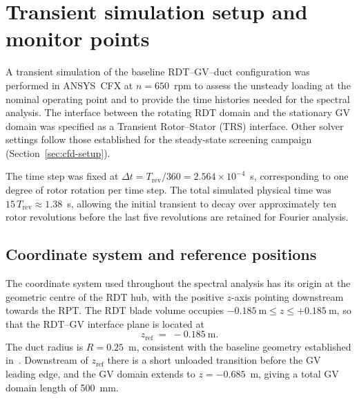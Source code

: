 
\section{Transient simulation setup and monitor points}
\label{sec:monitor-setup}

A transient simulation of the baseline \ac{RDT}--\ac{GV}--duct
configuration was performed in ANSYS~CFX at $n = 650$~rpm to assess
the unsteady loading at the nominal operating point and to provide
the time histories needed for the spectral analysis. The interface
between the rotating \ac{RDT} domain and the stationary \ac{GV}
domain was specified as a Transient Rotor--Stator (TRS) interface.
Other solver settings follow those established for the steady-state
screening campaign (Section~\ref{sec:cfd-setup}).

The time step was fixed at $\Delta t = T_{\mathrm{rev}}/360
= 2.564\times 10^{-4}$~s, corresponding to one degree of rotor
rotation per time step. The total simulated physical time was
$15\,T_{\mathrm{rev}} \approx 1.38$~s, allowing the initial
transient to decay over approximately ten rotor revolutions before
the last five revolutions are retained for Fourier analysis.

\subsection{Coordinate system and reference positions}
\label{sec:coord-system}

The coordinate system used throughout the spectral analysis has its
origin at the geometric centre of the \ac{RDT} hub, with the
positive $z$-axis pointing downstream towards the \ac{RPT}. The
\ac{RDT} blade volume occupies
$-0.185~\mathrm{m} \leq z \leq +0.185~\mathrm{m}$, so that the
\ac{RDT}--\ac{GV} interface plane is located at
\begin{equation}
    z_{\mathrm{ref}} \;=\; -0.185~\mathrm{m}. \label{eq:zref}
\end{equation}
The duct radius is $R = 0.25$~m, consistent with the baseline
geometry established in~\cite{leonsen2025}. Downstream of
$z_{\mathrm{ref}}$ there is a short unloaded transition before the
\ac{GV} leading edge, and the \ac{GV} domain extends to
$z = -0.685$~m, giving a total \ac{GV} domain length of 500~mm.


